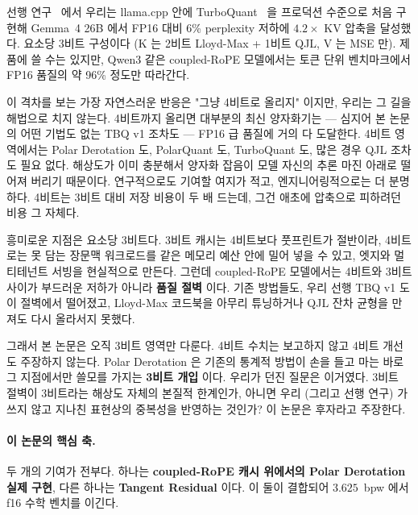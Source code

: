\documentclass[10pt,twocolumn]{article}
\begin{document}
선행 연구~\cite{turboquant_impl2026} 에서 우리는 llama.cpp 안에 TurboQuant~\cite{turboquant2026} 을 프로덕션 수준으로 처음 구현해 Gemma~4 26B 에서 FP16 대비 6\% perplexity 저하에 $4.2\times$ KV 압축을 달성했다. 요소당 3비트 구성이다 (K 는 2비트 Lloyd-Max + 1비트 QJL, V 는 MSE 만). 제품에 쓸 수는 있지만, Qwen3 같은 coupled-RoPE 모델에서는 토큰 단위 벤치마크에서 FP16 품질의 약 96\% 정도만 따라간다.

이 격차를 보는 가장 자연스러운 반응은 "그냥 4비트로 올리지" 이지만, 우리는 그 길을 해법으로 치지 않는다. 4비트까지 올리면 대부분의 최신 양자화기는 --- 심지어 본 논문의 어떤 기법도 없는 TBQ v1 조차도 --- FP16 급 품질에 거의 다 도달한다. 4비트 영역에서는 Polar Derotation 도, PolarQuant 도, TurboQuant 도, 많은 경우 QJL 조차도 필요 없다. 해상도가 이미 충분해서 양자화 잡음이 모델 자신의 추론 마진 아래로 떨어져 버리기 때문이다. 연구적으로도 기여할 여지가 적고, 엔지니어링적으로는 더 분명하다. 4비트는 3비트 대비 저장 비용이 두 배 드는데, 그건 애초에 압축으로 피하려던 비용 그 자체다.

흥미로운 지점은 요소당 3비트다. 3비트 캐시는 4비트보다 풋프린트가 절반이라, 4비트로는 못 담는 장문맥 워크로드를 같은 메모리 예산 안에 밀어 넣을 수 있고, 엣지와 멀티테넌트 서빙을 현실적으로 만든다. 그런데 coupled-RoPE 모델에서는 4비트와 3비트 사이가 부드러운 저하가 아니라 \textbf{품질 절벽} 이다. 기존 방법들도, 우리 선행 TBQ v1 도 이 절벽에서 떨어졌고, Lloyd-Max 코드북을 아무리 튜닝하거나 QJL 잔차 균형을 만져도 다시 올라서지 못했다.

그래서 본 논문은 오직 3비트 영역만 다룬다. 4비트 수치는 보고하지 않고 4비트 개선도 주장하지 않는다. Polar Derotation 은 기존의 통계적 방법이 손을 들고 마는 바로 그 지점에서만 쓸모를 가지는 \textbf{3비트 개입} 이다. 우리가 던진 질문은 이거였다. 3비트 절벽이 3비트라는 해상도 자체의 본질적 한계인가, 아니면 우리 (그리고 선행 연구) 가 쓰지 않고 지나친 표현상의 중복성을 반영하는 것인가? 이 논문은 후자라고 주장한다.

\paragraph{이 논문의 핵심 축.}
두 개의 기여가 전부다. 하나는 \textbf{coupled-RoPE 캐시 위에서의 Polar Derotation 실제 구현}, 다른 하나는 \textbf{Tangent Residual} 이다. 이 둘이 결합되어 $3.625$~bpw 에서 f16 수학 벤치를 이긴다.
\end{document}
